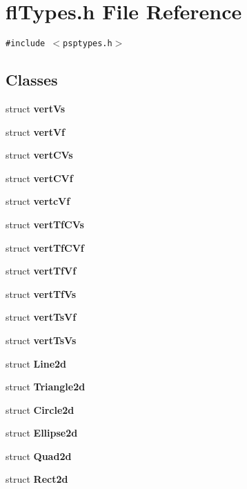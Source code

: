 \section{fl\-Types.h File Reference}
\label{flTypes_8h}
{\tt \#include $<$psptypes.h$>$}\par
\subsection*{Classes}
\begin{CompactItemize}
\item 
struct {\bf vert\-Vs}
\item 
struct {\bf vert\-Vf}
\item 
struct {\bf vert\-CVs}
\item 
struct {\bf vert\-CVf}
\item 
struct {\bf vertc\-Vf}
\item 
struct {\bf vert\-Tf\-CVs}
\item 
struct {\bf vert\-Tf\-CVf}
\item 
struct {\bf vert\-Tf\-Vf}
\item 
struct {\bf vert\-Tf\-Vs}
\item 
struct {\bf vert\-Ts\-Vf}
\item 
struct {\bf vert\-Ts\-Vs}
\item 
struct {\bf Line2d}
\item 
struct {\bf Triangle2d}
\item 
struct {\bf Circle2d}
\item 
struct {\bf Ellipse2d}
\item 
struct {\bf Quad2d}
\item 
struct {\bf Rect2d}
\end{CompactItemize}
